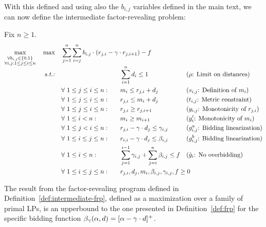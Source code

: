 With this defined and using also the $b_{i,j}$ variables defined in the main text, we can now define the intermediate factor-revealing problem:
\begin{definition}\label{def:intermediate-frp}
    Fix $n\geq 1$.
    \begin{equation*}
        \begin{aligned}
            \smash{\max_{\substack{\\ \forall b_{i,j}\in\{0,1\} \\ \forall i,j: 1\leq j\leq i \leq n}}} \quad 
            \max \quad 
            & \sum_{j=1}^{n} \smash{\sum_{i=j}^{n} b_{i,j} \cdot (r_{j,i} -\Mcoeff \cdot r_{j,i+1}) - f} \span\span\span\span\\
            \text{\emph{s.t.:}} \quad
                &&&\sum_{i=1}^{n} d_i \le 1 && \text{($\rho$: Limit on distances)}\\
                & \forall \ 1 \le j\le i \le n: 
                \quad && m_i \le r_{j,i} + d_j && \text{($s_{i,j}$: Definition of $m_i$)}\\
                & \forall \ 1 \le j \leq i \le n:
                \quad && r_{j,i} \le m_i + d_j && \text{($t_{i,j}$: Metric constraint)}\\
                & \forall \ 1 \le j \le i \le n: 
                \quad &&r_{j,i} \ge r_{j,i+1} && \text{($y_{i,j}$: Monotonicity of $r_{j,i}$)}\\
                & \forall \ 1 \le i < n: 
                \quad && m_i \ge m_{i+1} && \text{($y'_i$: Monotonicity of $m_i$)}\\
                & \forall \ 1\le j <i\le n: 
                \quad && r_{j,i} - \Mcoeff \cdot d_j \le \gamma_{i,j} && \text{($g^a_{i,j}$: Bidding linearization)}\\
                & \forall \ 1\le i\le j\le n: 
                \quad && r_{i,i} -\Mcoeff \cdot d_j \le \beta_{i,j} && \text{($g^b_{i,j}$: Bidding linearization)}\\
                & \forall \ 1\le i\le n: \quad && \sum_{j=1}^{i-1} \gamma_{i,j} + \sum_{j=i}^{n} \beta_{i,j} \le f && \text{($\hg_i$: No overbidding)}\\
                & \forall \ 1\le i\le j\le n: && r_{j,i}, d_{j}, m_i, \beta_{i,j}, \gamma_{i,j}, f \ge 0 \span\span
        \end{aligned}
    \end{equation*}
\end{definition}
\begin{lemma}\label{lemma:generalized-factor-revealing-problem-metric-rewrite}
    The result from the factor-revealing program defined in Definition~\ref{def:intermediate-frp}, defined as a maximization over a family of primal LPs, is an upperbound to the one presented in Definition~\ref{def:frp} for the specific bidding function $\beta_{\gamma}(\alpha, d) = [\alpha - \gamma \cdot d]^+$.
\end{lemma}
